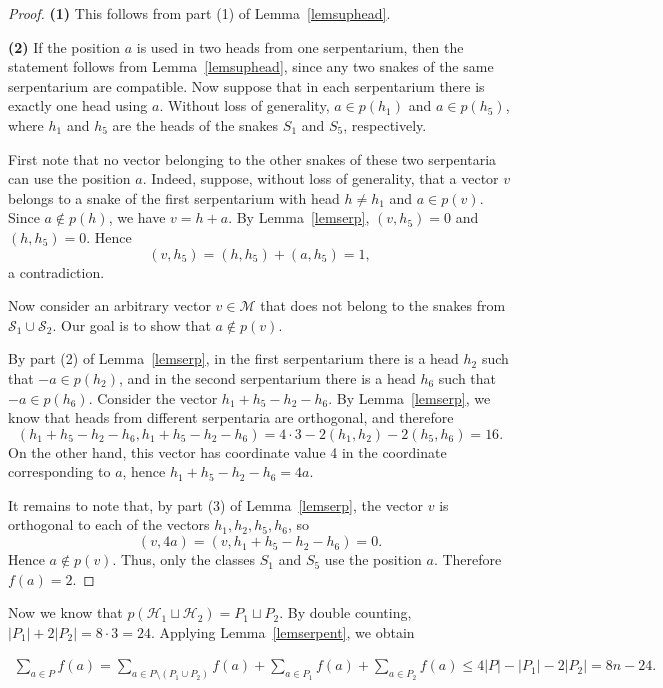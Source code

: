 \documentclass[12pt,a4paper]{article}
\newcommand{\M}{\mathcal{M}}
\begin{document}
\begin{proof}

    {\bf (1)} This follows from part (1) of Lemma~\ref{lemsuphead}.

    {\bf (2)} If the position $a$ is used in two heads from one serpentarium, then the statement follows from Lemma~\ref{lemsuphead}, since any two snakes of the same serpentarium are compatible. Now suppose that in each serpentarium there is exactly one head using $a$. Without loss of generality, $a\in p(h_1)$ and $a\in p(h_5)$, where $h_1$ and $h_5$ are the heads of the snakes $S_1$ and $S_5$, respectively.

    First note that no vector belonging to the other snakes of these two serpentaria can use the position $a$. Indeed, suppose, without loss of generality, that a vector $v$ belongs to a snake of the first serpentarium with head $h\ne h_1$ and $a\in p(v)$. Since $a\notin p(h)$, we have $v=h+a$. By Lemma~\ref{lemserp}, $(v,h_5)=0$ and $(h,h_5)=0$. Hence
    $$(v,h_5)=(h,h_5)+(a,h_5)=1,$$
    a contradiction.

    Now consider an arbitrary vector $v\in\M$ that does not belong to the snakes from $\mathcal S_1\cup\mathcal S_2$. Our goal is to show that $a \notin p(v)$.

    By part (2) of Lemma~\ref{lemserp}, in the first serpentarium there is a head $h_2$ such that $-a\in p(h_2)$, and in the second serpentarium there is a head $h_6$ such that $-a\in p(h_6)$. Consider the vector $h_1+h_5-h_2-h_6$. By Lemma~\ref{lemserp}, we know that heads from different serpentaria are orthogonal, and therefore
    $$(h_1+h_5-h_2-h_6, h_1+h_5-h_2-h_6)=4\cdot3-2(h_1,h_2)-2(h_5,h_6)=16.$$
    On the other hand, this vector has coordinate value 4 in the coordinate corresponding to $a$, hence $h_1+h_5-h_2-h_6=4a$.

    It remains to note that, by part (3) of Lemma~\ref{lemserp}, the vector $v$ is orthogonal to each of the vectors $h_1,h_2,h_5,h_6$, so
    $$(v,4a)=(v,h_1+h_5-h_2-h_6)=0.$$
    Hence $a\notin p(v)$. Thus, only the classes $S_1$ and $S_5$ use the position $a$. Therefore $f(a)=2$.

\end{proof}

Now we know that $p(\mathcal H_1 \sqcup \mathcal H_2)=P_1\sqcup P_2$. By double counting, $|P_1|+2|P_2|=8\cdot3=24$. Applying Lemma~\ref{lemserpent}, we obtain

\begin{align}\label{eq5}
    \sum_{a \in P} f(a) = \sum_{a \in P \setminus (P_1 \cup P_2)} f(a) + \sum_{a \in P_1} f(a) + \sum_{a \in P_2} f(a) \leqslant 4|P| - |P_1| - 2|P_2| = 8n-24.
\end{align}
\end{document}
